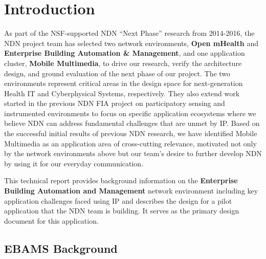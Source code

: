 \section{Introduction}

As part of the NSF-supported NDN ``Next Phase'' research from 2014-2016, 
the NDN project team has selected two network environments, {\bf Open mHealth} and {\bf
Enterprise Building Automation \& Management}, and one application
cluster, {\bf Mobile Multimedia}, to drive our research, verify the
architecture design, and ground evaluation of the next phase of our project.
The two environments represent critical areas in the design space for
next-generation Health IT and Cyberphysical Systems, respectively.  They
also extend work started in the previous NDN FIA project on participatory
sensing and instrumented environments to focus on specific application
ecosystems where we believe NDN can address fundamental challenges that
are unmet by IP.  Based on the successful initial results of previous
NDN research, we have identified Mobile  Multimedia as an application
area of cross-cutting relevance, motivated not only by the
network environments above but our team's desire to further develop
NDN by using it for our everyday communication.

This technical report provides background information on the {\bf Enterprise Building Automation and Management}
network environment including key application challenges faced using
IP and describes the design for a pilot application that the NDN team is 
building.  It serves as the primary design document for this application. 

\subsection{EBAMS Background}

